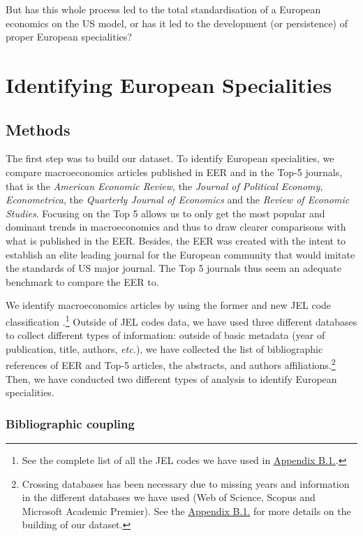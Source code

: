 \documentclass[]{elsarticle} %
\begin{document}
But has this whole process led to the total standardisation of a
European economics on the US model, or has it led to the development (or
persistence) of proper European specialities?

\hypertarget{european-specialities}{%
\section{Identifying European
Specialities}\label{european-specialities}}

\hypertarget{methods}{%
\subsection{Methods}\label{methods}}

The first step was to build our dataset. To identify European
specialities, we compare macroeconomics articles published in EER and in
the Top-5 journals, that is the \emph{American Economic Review}, the
\emph{Journal of Political Economy}, \emph{Econometrica}, the
\emph{Quarterly Journal of Economics} and the \emph{Review of Economic
Studies}. Focusing on the Top 5 allows us to only get the most popular
and dominant trends in macroeconomics and thus to draw clearer
comparisons with what is published in the EER. Besides, the EER was
created with the intent to establish an elite leading journal for the
European community that would imitate the standards of US major journal.
The Top 5 journals thus seem an adequate benchmark to compare the EER
to.

We identify macroeconomics articles by using the former and new JEL code
classification \citep{jel1991}.\footnote{See the complete list of all
  the JEL codes we have used in
  \protect\hyperlink{eer-top5-macro}{Appendix B.1.}.} Outside of JEL
codes data, we have used three different databases to collect different
types of information: outside of basic metadata (year of publication,
title, authors, \emph{etc.}), we have collected the list of
bibliographic references of EER and Top-5 articles, the abstracts, and
authors affiliations.\footnote{Crossing databases has been necessary due
  to missing years and information in the different databases we have
  used (Web of Science, Scopus and Microsoft Academic Premier). See the
  \protect\hyperlink{corpus}{Appendix B.1.} for more details on the
  building of our dataset.} Then, we have conducted two different types
of analysis to identify European specialities.

\hypertarget{bibliographic-coupling}{%
\subsubsection{Bibliographic coupling}\label{bibliographic-coupling}}
\end{document}

